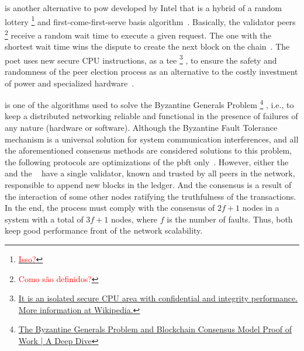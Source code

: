 \begin{description}[font={\normalfont\bfseries}]
    
    \item[\glsitem{poet}] is another alternative to \gls{pow} developed by Intel that is a hybrid of a random lottery%
    \footnote{\href{https://en.wikipedia.org/wiki/Random_number_generation}{\textcolor{red}{Isso?}}}
    and first-come-first-serve basis algorithm~\cite{LFS171x}.
    Basically, the validator peers%
    \footnote{\textcolor{red}{Como são definidos?}}
    receive a random wait time to execute a given request.
    The one with the shortest wait time wins the dispute to create the next block on the chain~\cite{LFS171x, poet}.
    The \gls{poet} uses new secure CPU instructions, as a \gls{tee}%
    \footnote{\href{https://en.wikipedia.org/wiki/Trusted_execution_environment}{It is an isolated secure CPU area with confidential and integrity performance. More information at Wikipedia.}}%
    , to ensure the safety and randomness of the peer election process as an alternative to the costly investment of power and specialized hardware~\cite{poet}.
    
    \item[\glsitem{pbft}] is one of the algorithms used to solve the Byzantine Generals Problem%
    \footnote{\href{https://achainofblocks.com/2018/08/09/byzantine-generals-problem-proof-of-work/}{The Byzantine Generals Problem and Blockchain Consensus Model Proof of Work | A Deep Dive}}
    , i.e., to keep a distributed networking reliable and functional in the presence of failures of any nature (hardware or software).
    Although the Byzantine Fault Tolerance mechanism is a universal solution for system communication interferences,
    and all the aforementioned consensus methods are considered solutions to this problem,
    the following protocols are optimizations of the \gls{pbft} only~\cite{neowp, LFS171x}.
    However, either the \textbf{}~\cite{LFS171x} and the \textbf{}~\cite{neowp} have a single validator, known and trusted by all peers in the network, responsible to append new blocks in the ledger.
    And the consensus is a result of the interaction of some other nodes ratifying the truthfulness of the transactions.
    In the end, the process must comply with the consensus of $2f+1$ nodes in a system with a total of $3f+1$ nodes, where $f$ is the number of faults.
    Thus, both keep good performance front of the network scalability.


\end{description}
